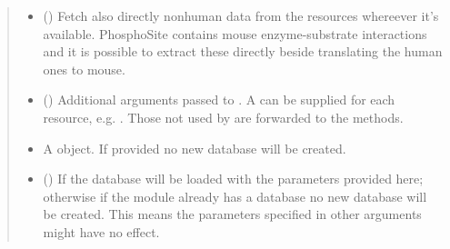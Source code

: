 \documentclass[letterpaper,10pt,english]{sphinxmanual}
\begin{document}
\begin{fulllineitems}
\begin{fulllineitems}
\begin{quote}
\begin{description}
\begin{itemize}
\item {} 
 () \textendash{} Fetch also directly nonhuman
data from the resources whereever it’s available. PhosphoSite
contains mouse enzyme-substrate interactions and it is possible
to extract these directly beside translating the human ones
to mouse.

\item {} 
 () \textendash{} Additional arguments passed to .
A  can be supplied for each resource, e.g.
.
Those not used by  are forwarded to the
 methods.

\item {} 
 \textendash{} A  object. If provided no new database will be
created.

\item {} 
 () \textendash{} If  the database will be loaded with the parameters
provided here; otherwise if the  module already has a
database no new database will be created. This means the
parameters specified in other arguments might have no effect.

\end{itemize}

\end{description}\end{quote}

\end{fulllineitems}



\end{fulllineitems}
\end{document}
